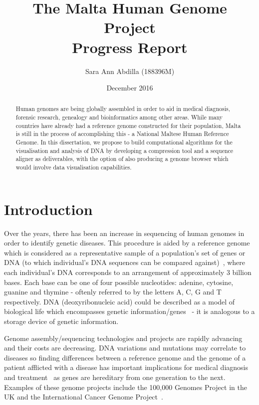 \documentclass{csfyp}
\title{The Malta Human Genome Project \\
  \large Progress Report}
\author{Sara Ann Abdilla (188396M)}
\date{December 2016}
\begin{document}
\tableofcontents
\newpage
\listoffigures

\newpage

\setcounter{page}{1}


\begin{abstract}
Human genomes are being globally assembled in order to aid in medical diagnosis, forensic research, genealogy and bioinformatics among other areas.  While many countries have already had a reference genome constructed for their population, Malta is still in the process of accomplishing this - a National Maltese Human Reference Genome.  In this dissertation, we propose to build computational algorithms for the visualisation and analysis of DNA by developing a compression tool and a sequence aligner as deliverables, with the option of also producing a genome browser which would involve data visualisation capabilities.
\end{abstract}


\section{Introduction}\vspace{-2ex}
\label{s:intro}

Over the years, there has been an increase in sequencing of human genomes in order to identify genetic diseases.  This procedure is aided by a reference genome which is considered as a representative sample of a population's set of genes or DNA (to which individual's DNA sequences can be compared against)~\cite{omics}, where each individual's DNA corresponds to an arrangement of approximately 3 billion bases.  Each base can be one of four possible nucleotides: adenine, cytosine, guanine and thymine - oftenly referred to by the letters A, C, G and T respectively.  DNA (deoxyribonucleic acid) could be described as a model of biological life which encompasses genetic information/genes~\cite{aiBk, introgenom} - it is analogous to a storage device of genetic information.  

Genome assembly/sequencing technologies and projects are rapidly advancing and their costs are decreasing.  DNA variations and mutations may correlate to diseases so finding differences between a reference genome and the genome of a patient afflicted with a disease has important implications for medical diagnosis and treatment~\cite{think} as genes are hereditary from one generation to the next.  Examples of these genome projects include the 100,000 Genomes Project in the UK and the International Cancer Genome Project~\cite{bwtransform, refcompression, popgen}.
\end{document}
